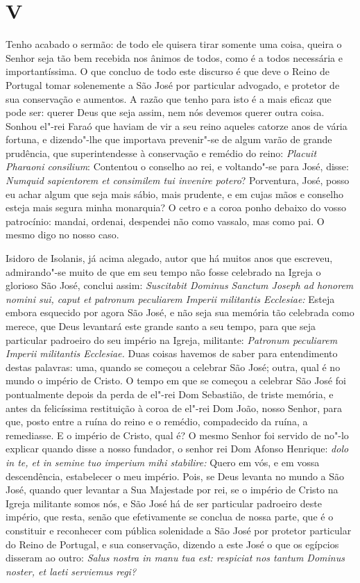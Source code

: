 \section*{V}

Tenho acabado o sermão: de todo ele quisera tirar somente uma coisa,
queira o Senhor seja tão bem recebida nos ânimos de todos, como é a
todos necessária e importantíssima. O que concluo de todo este discurso
é que deve o Reino de Portugal tomar solenemente a São José por
particular advogado, e protetor de sua conservação e aumentos. A razão que tenho
para isto é a mais eficaz que pode ser: querer Deus que seja assim, nem
nós devemos querer outra coisa. Sonhou el"-rei Faraó que haviam de vir a
seu reino aqueles catorze anos de vária fortuna, e dizendo"-lhe que
importava prevenir"-se de algum varão de grande prudência, que
superintendesse à conservação e remédio do reino: \emph{Placuit Pharaoni
consilium}: Contentou o conselho ao rei, e voltando"-se
para José, disse: \emph{Numquid sapientorem et consimilem tui invenire
potero}? Porventura, José, posso eu achar algum que seja mais
sábio, mais prudente, e em cujas mãos e conselho esteja mais segura
minha monarquia? O cetro e a coroa ponho debaixo do vosso patrocínio:
mandai, ordenai, despendei não como vassalo, mas como pai. O mesmo digo
no nosso caso.

Isidoro de Isolanis, já acima alegado, autor que há muitos anos que
escreveu, admirando"-se muito de que em seu tempo não fosse celebrado na
Igreja o glorioso São José, conclui assim: \emph{Suscitabit Dominus
Sanctum Joseph ad honorem nomini sui, caput et patronum peculiarem
Imperii militantis Ecclesiae:} Esteja embora esquecido por agora São
José, e não seja sua memória tão celebrada como merece, que Deus
levantará este grande santo a seu tempo, para que seja particular
padroeiro do seu império na Igreja, militante: \emph{Patronum peculiarem
Imperii militantis Ecclesiae.} Duas coisas havemos de saber para
entendimento destas palavras: uma, quando se começou a celebrar São
José; outra, qual é no mundo o império de Cristo. O tempo em que se
começou a celebrar São José foi pontualmente depois da perda de el"-rei
Dom Sebastião, de triste memória, e antes da felicíssima restituição à
coroa de el"-rei Dom João, nosso Senhor, para que, posto entre a ruína do
reino e o remédio, compadecido da ruína, a remediasse. E o império de
Cristo, qual é? O mesmo Senhor foi servido de no"-lo explicar quando
disse a nosso fundador, o senhor rei Dom Afonso Henrique: \emph{dolo in
te, et in semine tuo imperium mihi stabilire:} Quero em vós, e em vossa
descendência, estabelecer o meu império. Pois, se Deus levanta no
mundo a São José, quando quer levantar a Sua Majestade por rei, se o
império de Cristo na Igreja militante somos nós, e São José há de ser
particular padroeiro deste império, que resta, senão que efetivamente se
conclua de nossa parte, que é o constituir e reconhecer com pública
solenidade a São José por protetor particular do Reino de Portugal, e
sua conservação, dizendo a este José o que os egípcios disseram ao
outro: \emph{Salus nostra in manu tua est: respiciat nos tantum Dominus
noster, et laeti serviemus regi?}


